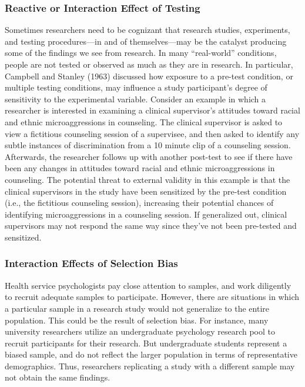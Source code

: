 \documentclass[
  11pt,
]{book}
\begin{document}
\hypertarget{reactive-or-interaction-effect-of-testing}{%
\subsubsection{Reactive or Interaction Effect of Testing}\label{reactive-or-interaction-effect-of-testing}}

Sometimes researchers need to be cognizant that research studies, experiments, and testing procedures---in and of themselves---may be the catalyst producing some of the findings we see from research. In many ``real-world'' conditions, people are not tested or observed as much as they are in research. In particular, Campbell and Stanley (1963) discussed how exposure to a pre-test condition, or multiple testing conditions, may influence a study participant's degree of sensitivity to the experimental variable. Consider an example in which a researcher is interested in examining a clinical supervisor's attitudes toward racial and ethnic microaggressions in counseling. The clinical supervisor is asked to view a fictitious counseling session of a supervisee, and then asked to identify any subtle instances of discrimination from a 10 minute clip of a counseling session. Afterwards, the researcher follows up with another post-test to see if there have been any changes in attitudes toward racial and ethnic microaggressions in counseling. The potential threat to external validity in this example is that the clinical supervisors in the study have been sensitized by the pre-test condition (i.e., the fictitious counseling session), increasing their potential chances of identifying microaggressions in a counseling session. If generalized out, clinical supervisors may not respond the same way since they've not been pre-tested and sensitized.

\hypertarget{interaction-effects-of-selection-bias}{%
\subsubsection{Interaction Effects of Selection Bias}\label{interaction-effects-of-selection-bias}}

Health service psychologists pay close attention to samples, and work diligently to recruit adequate samples to participate. However, there are situations in which a particular sample in a research study would not generalize to the entire population. This could be the result of selection bias. For instance, many university researchers utilize an undergraduate psychology research pool to recruit participants for their research. But undergraduate students represent a biased sample, and do not reflect the larger population in terms of representative demographics. Thus, researchers replicating a study with a different sample may not obtain the same findings.
\end{document}

